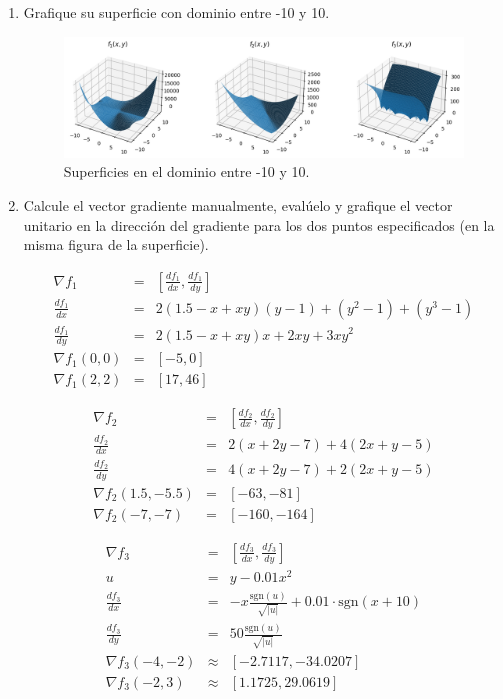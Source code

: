 \documentclass{article}
\begin{document}
\begin{enumerate}
\item Grafique su superficie con dominio entre -10 y 10.

\begin{figure}[h]
\centering
\includegraphics[width=\linewidth]{img/surfaces.png}
\caption{Superficies en el dominio entre -10 y 10.}
\label{fig:surfaces}
\end{figure}

\item Calcule el vector gradiente manualmente, evalúelo y grafique el vector unitario en la dirección del gradiente para los dos puntos especificados (en la misma figura de la superficie).

\begin{equation}
\begin{array}{rcl}
\nabla f_1&=&\left[\frac{df_1}{dx},\frac{df_1}{dy}\right]\\
\frac{df_1}{dx}&=&2(1.5-x+xy)(y-1)+(y^2-1)+(y^3-1)\\
\frac{df_1}{dy}&=&2(1.5-x+xy)x+2xy+3xy^2\\
\nabla f_1(0,0)&=&[-5,0]\\
\nabla f_1(2,2)&=&[17,46]
\end{array}
\end{equation}

\begin{equation}
\begin{array}{rcl}
\nabla f_2&=&\left[\frac{df_2}{dx},\frac{df_2}{dy}\right]\\
\frac{df_2}{dx}&=&2(x+2y-7)+4(2x+y-5)\\
\frac{df_2}{dy}&=&4(x+2y-7)+2(2x+y-5)\\
\nabla f_2(1.5,-5.5)&=&[-63,-81]\\
\nabla f_2(-7,-7)&=&[-160,-164]
\end{array}
\end{equation}

\begin{equation}
\begin{array}{rcl}
\nabla f_3&=&\left[\frac{df_3}{dx},\frac{df_3}{dy}\right]\\
u&=&y-0.01x^2\\
\frac{df_3}{dx}&=&-x\frac{\text{sgn}(u)}{\sqrt{|u|}}+0.01\cdot\text{sgn}(x+10)\\
\frac{df_3}{dy}&=&50\frac{\text{sgn}(u)}{\sqrt{|u|}}\\
\nabla f_3(-4,-2)&\approx&[-2.7117,-34.0207]\\
\nabla f_3(-2,3)&\approx&[1.1725,29.0619]
\end{array}
\end{equation}


\end{enumerate}
\end{document}
